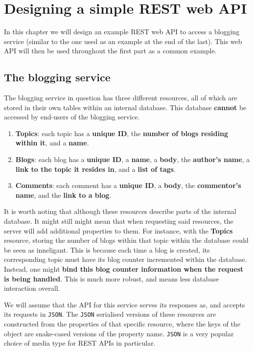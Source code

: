 \chapter{Designing a simple REST web API}
\label{chap:designing-rest-api}

In this chapter we will design an example REST web API to access a blogging service (similar to the one used as an example at the end of the last). This web API will then be used throughout the first part as a common example.

\section{The blogging service}
\label{sec:designing-rest-api-blogging-service}

The blogging service in question has three different resources, all of which are stored in their own tables within an internal database. This database \textbf{cannot} be accessed by end-users of the blogging service.

\begin{enumerate}
    \item \textbf{Topics}: each topic has a \textbf{unique ID}, the \textbf{number of blogs residing within it}, and a \textbf{name}.
    \item \textbf{Blogs}: each blog has a \textbf{unique ID}, a \textbf{name}, a \textbf{body}, the \textbf{author's name}, a \textbf{link to the topic it resides in}, and a \textbf{list of tags}.
    \item \textbf{Comments}: each comment has a \textbf{unique ID}, a \textbf{body}, the \textbf{commentor's name}, and the \textbf{link to a blog}.
\end{enumerate}

It is worth noting that although these resources describe parts of the internal database. It might still might mean that when requesting said resources, the server will add additional properties to them. For instance, with the \textbf{Topics} resource, storing the number of blogs within that topic within the database could be seen as inneligant. This is because each time a blog is created, its corresponding topic must have its blog counter incremented within the database. Instead, one might \textbf{bind this blog counter information when the request is being handled}. This is much more robust, and means less database interaction overall.

We will assume that the API for this service serves its responses as, and accepts its requests in \verb|JSON|. The \verb|JSON| serialised versions of these resources are constructed from the properties of that specific resource, where the keys of the object are snake-cased versions of the property name. \verb|JSON| is a very popular choice of media type for REST APIs in particular.

